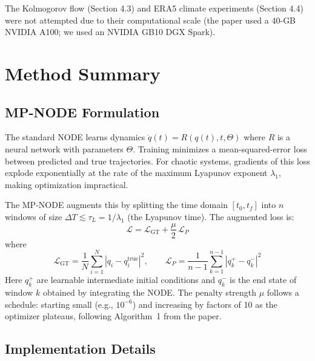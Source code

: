 \documentclass[11pt]{article}
\begin{document}
The Kolmogorov flow (Section 4.3) and ERA5 climate experiments (Section 4.4) were not attempted due to their computational scale (the paper used a 40-GB NVIDIA A100; we used an NVIDIA GB10 DGX Spark).

\section{Method Summary}

\subsection{MP-NODE Formulation}

The standard NODE learns dynamics $\dot{q}(t) = R(q(t), t, \Theta)$ where $R$ is a neural network with parameters $\Theta$. Training minimizes a mean-squared-error loss between predicted and true trajectories. For chaotic systems, gradients of this loss explode exponentially at the rate of the maximum Lyapunov exponent $\lambda_1$, making optimization impractical.

The MP-NODE augments this by splitting the time domain $[t_0, t_f]$ into $n$ windows of size $\Delta T \lesssim \tau_L = 1/\lambda_1$ (the Lyapunov time). The augmented loss is:
\begin{equation}
    \mathcal{L} = \mathcal{L}_{\text{GT}} + \frac{\mu}{2}\,\mathcal{L}_P
\end{equation}
where
\begin{equation}
    \mathcal{L}_{\text{GT}} = \frac{1}{N}\sum_{i=1}^{N} |q_i - q_i^{\text{true}}|^2, \qquad
    \mathcal{L}_P = \frac{1}{n-1}\sum_{k=1}^{n-1} |q_k^+ - q_k^-|^2
\end{equation}
Here $q_k^+$ are learnable intermediate initial conditions and $q_k^-$ is the end state of window $k$ obtained by integrating the NODE. The penalty strength $\mu$ follows a schedule: starting small (e.g., $10^{-6}$) and increasing by factors of 10 as the optimizer plateaus, following Algorithm~1 from the paper.

\subsection{Implementation Details}
\end{document}
